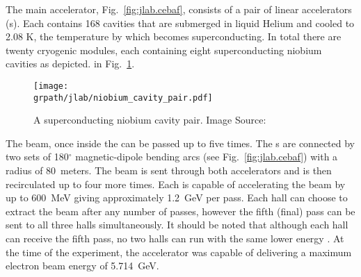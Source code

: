 The main accelerator, Fig.~\ref{fig:jlab.cebaf}, consists of a pair of linear accelerators (s\label{abbr:linac}). Each  contains 168   cavities that are submerged in liquid Helium and cooled to 2.08 K, the temperature by which  becomes superconducting. In total there are twenty cryogenic modules, each containing eight superconducting niobium cavities as depicted. in Fig.~\ref{fig:jlab.cavity}. 


\begin{figure}\begin{center} 
\texttt{[image: \\grpath/jlab/niobium\_cavity\_pair.pdf]}
\caption[Niobium Cavity Pair (photograph)]{\label{fig:jlab.cavity}A  superconducting niobium cavity pair. Image Source: \cite{cebaf}}
\end{center}\end{figure}

The beam, once inside the  can be passed up to five times. The s are connected by two sets of 180$^\circ$ magnetic-dipole bending arcs (see Fig.~\ref{fig:jlab.cebaf}) with a radius of 80~meters. The beam is sent through both accelerators and is then recirculated up to four more times. Each  is capable of accelerating the beam by up to 600~MeV giving approximately 1.2~GeV per pass. Each hall can choose to extract the beam after any number of passes, however the fifth (final) pass can be sent to all three halls simultaneously. It should be noted that although each hall can receive the fifth pass, no two halls can run with the same lower energy \cite{clas.pass}. At the time of the  experiment, the accelerator was capable of delivering a maximum electron beam energy of 5.714~GeV.
